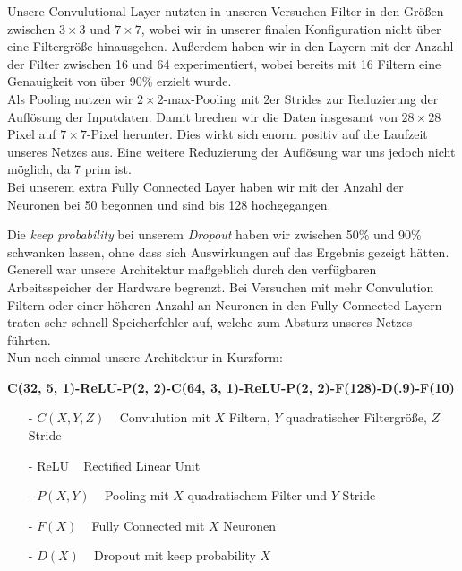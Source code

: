 \documentclass[10pt,journal,compsoc]{IEEEtran}
\begin{document}
\noindent Unsere Convulutional Layer nutzten in unseren Versuchen Filter in den Größen zwischen $3\times 3$ und $7\times 7$, wobei wir in unserer finalen Konfiguration nicht über eine Filtergröße hinausgehen. Außerdem haben wir in den Layern mit der Anzahl der Filter zwischen 16 und 64 experimentiert, wobei bereits mit 16 Filtern eine Genauigkeit von über 90\% erzielt wurde.\\

\noindent Als Pooling nutzen wir $2\times 2$-max-Pooling mit 2er Strides zur Reduzierung der Auflösung der Inputdaten. Damit brechen wir die Daten insgesamt von $28\times 28$ Pixel auf $7\times 7$-Pixel herunter. Dies wirkt sich enorm positiv auf die Laufzeit unseres Netzes aus. Eine weitere Reduzierung der Auflösung war uns jedoch nicht möglich, da 7 prim ist.\\

\noindent Bei unserem extra Fully Connected Layer haben wir mit der Anzahl der Neuronen bei 50 begonnen und sind bis 128 hochgegangen.

Die \emph{keep probability} bei unserem \emph{Dropout} haben wir zwischen 50\% und 90\% schwanken lassen, ohne dass sich Auswirkungen auf das Ergebnis gezeigt hätten.
Generell war unsere Architektur maßgeblich durch den verfügbaren Arbeitsspeicher der Hardware begrenzt. Bei Versuchen mit mehr Convulution Filtern oder einer höheren Anzahl an Neuronen in den Fully Connected Layern traten sehr schnell Speicherfehler auf, welche zum Absturz unseres Netzes führten.\\

\newpage
\noindent Nun noch einmal unsere Architektur in Kurzform:

\begin{scriptsize}
\textbf{
C(32, 5, 1)-ReLU-P(2, 2)-C(64, 3, 1)-ReLU-P(2, 2)-F(128)-D(.9)-F(10)}
\end{scriptsize}

\begin{itemize}
\item[-] $C(X, Y, Z)$ ~ Convulution mit $X$ Filtern, $Y$ quadratischer Filtergröße, $Z$ Stride
\item[-] ReLU ~ Rectified Linear Unit
\item[-] $P(X, Y)$ ~ Pooling mit $X$ quadratischem Filter und $Y$ Stride
\item[-] $F(X)$ ~ Fully Connected mit $X$ Neuronen
\item[-] $D(X)$ ~ Dropout mit keep probability $X$
\end{itemize}
\end{document}
